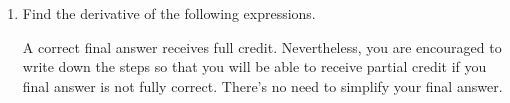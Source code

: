 \documentclass[11pt]{article}
\begin{document}
\begin{enumerate}
\begin{center}
        \begin{tabular}{l c l l c l}
            $\displaystyle\frac{d}{dx}\left[ \log_{1/3}(3) \right]$ & $=$ & {\color{blue} 0} &
            $\displaystyle\frac{d}{dx}\left[ 3e^x-\dfrac{4}{x^4} \right]$ & $=$ & {\color{blue} $3e^x+16x^{-5}$ }\\[1in]
            $\displaystyle\frac{d}{dx}\left[ \log_9(x) \right]$ & $=$ & {\color{blue} $\displaystyle\frac{1}{x \cdot \ln 9}$} &
            $\displaystyle\frac{d}{dx}\left[ \left(\dfrac{5}{2}\right)^x \right]$ & $=$ & {\color{blue} $\left(\displaystyle \frac{5}{2} \right)^x \cdot \ln\left( \displaystyle\frac{5}{2} \right)$}\\[1in]
            $\displaystyle\frac{d}{dx}\left[ \dfrac{2x^8-10x}{x^2} \right]$ & $=$ & {\color{blue} $\displaystyle\frac{d}{dx}\left[2x^6 -10x^{-1}\right] = 12x^5+10x^{-2}$} & 
            $\displaystyle\frac{d}{dx}\left[ 6\sqrt{x^3}-11 \right]$ & $=$ & {\color{blue}  $\displaystyle\frac{d}{dx}[ 6 x^{3/2} ] = 9\sqrt{x}$}\\[0.3in]
        \end{tabular}
        
\end{center}


\newpage


\item Find the derivative of the following expressions. 

A correct final answer receives full credit. Nevertheless, you are encouraged to write down the steps so that you will be able to receive partial credit if you final answer is not fully correct. There's no need to simplify your final answer.


\end{enumerate}
\end{document}
